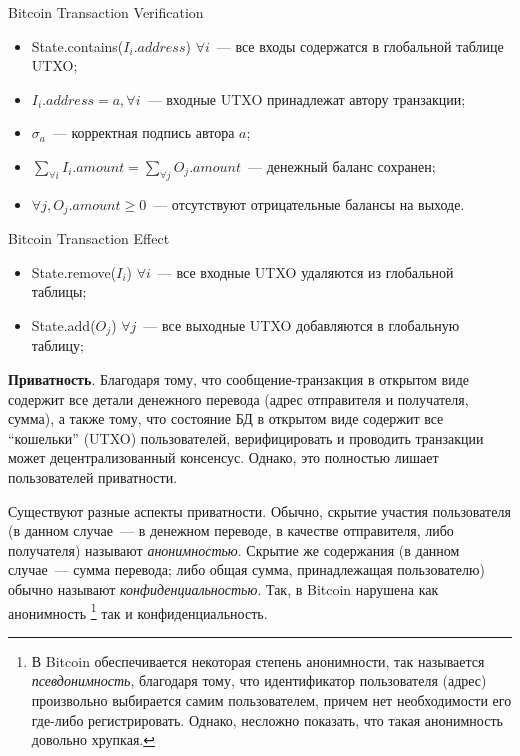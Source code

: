 \documentclass{article}
\begin{document}
\begin{algorithm}
\caption{Bitcoin Transaction Verification}
\begin{itemize}
  \item
  State.contains($I_i.address$) $\forall i$~--- все входы содержатся в глобальной таблице UTXO;
  \item
  $I_i.address = a, \forall i$~--- входные UTXO принадлежат автору транзакции;
  \item
   $\sigma_a$~--- корректная подпись автора $a$;
  \item
  $\sum_{\forall i} {I_i.amount} = \sum_{\forall j} {O_j.amount}$~--- денежный баланс сохранен;
  \item
  $ \forall j, O_j.amount \ge 0$~--- отсутствуют отрицательные балансы на выходе.
\end{itemize}
\end{algorithm}

\begin{algorithm}
\caption{Bitcoin Transaction Effect}
\begin{itemize}
  \item
  State.remove($I_i$) $\forall i$~--- все входные UTXO удаляются из глобальной таблицы;
  \item
  State.add($O_j$) $\forall j$~--- все выходные UTXO добавляются в глобальную таблицу;
\end{itemize}
\end{algorithm}

{\bf Приватность}.
 Благодаря тому, что сообщение-транзакция в открытом виде
содержит все детали денежного перевода (адрес отправителя и получателя, сумма),
а также тому, что состояние БД в открытом виде содержит все ``кошельки'' (UTXO) пользователей,
верифицировать и проводить транзакции может децентрализованный консенсус.
Однако, это полностью лишает пользователей приватности.

Существуют разные аспекты приватности. Обычно, скрытие участия пользователя
(в данном случае~--- в денежном переводе, в качестве отправителя, либо получателя)
 называют \textit{анонимностью}. Скрытие же содержания (в данном случае~--- сумма перевода;
 либо общая сумма, принадлежащая пользователю)  обычно называют \textit{конфиденциальностью}.
Так, в Bitcoin нарушена как анонимность
\footnote{ В Bitcoin обеспечивается некоторая степень анонимности,
так называется \textit{псевдонимность},
благодаря тому, что идентификатор пользователя (адрес) произвольно выбирается самим пользователем,
причем нет необходимости его где-либо регистрировать. Однако, несложно показать, что такая анонимность
довольно хрупкая.}
 так и конфиденциальность.
\end{document}
